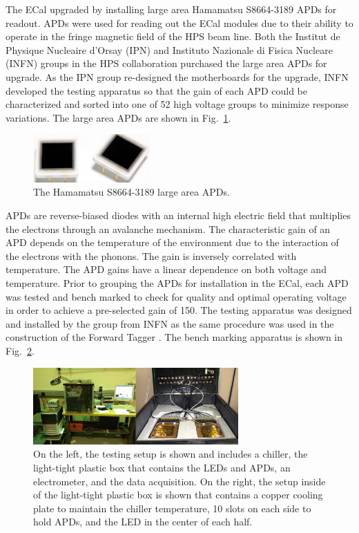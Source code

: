 The ECal upgraded by installing large area Hamamatsu S8664-3189 APDs for readout. APDs were used for reading out the ECal modules due to their ability to operate in the fringe magnetic field of the HPS beam line. Both the Institut de Physique Nucleaire d'Orsay (IPN) and Instituto Nazionale di Fisica Nucleare (INFN) groups in the HPS collaboration purchased the large area APDs for upgrade. As the IPN group re-designed the motherboards for the upgrade, INFN developed the testing apparatus so that the gain of each APD could be characterized and sorted into one of 52 high voltage groups to minimize response variations. The large area APDs are shown in Fig.~\ref{Figure:apd}.

\begin{figure}[H]
  \centering
      \includegraphics[width=0.4\textwidth]{pics/experiment/apd.png}
  \caption[Hamamatsu S8664-3189 large area APDs]{The Hamamatsu S8664-3189 large area APDs.}
  \label{Figure:apd}
\end{figure}

APDs are reverse-biased diodes with an internal high electric field that multiplies the electrons through an avalanche mechanism.  The characteristic gain of an APD depends on the temperature of the environment due to the interaction of the electrons with the phonons. The gain is inversely correlated with temperature.  The APD gains have a linear dependence on both voltage and temperature. Prior to grouping the APDs for installation in the ECal, each APD was tested and bench marked to check for quality and optimal operating voltage in order to achieve a pre-selected gain of 150. The testing apparatus was designed and installed by the group from INFN as the same procedure was used in the construction of the Forward Tagger \cite{celentano_2014}. The bench marking apparatus is shown in Fig.~\ref{Figure:apdtest}.

\begin{figure}[H]
  \centering
      \includegraphics[width=0.7\textwidth]{pics/experiment/apdtests.png}
  \caption[Testing assembly for large area APDs]{On the left, the testing setup is shown and includes a chiller, the light-tight plastic box that contains the LEDs and APDs, an electrometer, and the data acquisition. On the right, the setup inside of the light-tight plastic box is shown that contains a copper cooling plate to maintain the chiller temperature, 10 slots on each side to hold APDs, and the LED in the center of each half.}
  \label{Figure:apdtest}
\end{figure}

